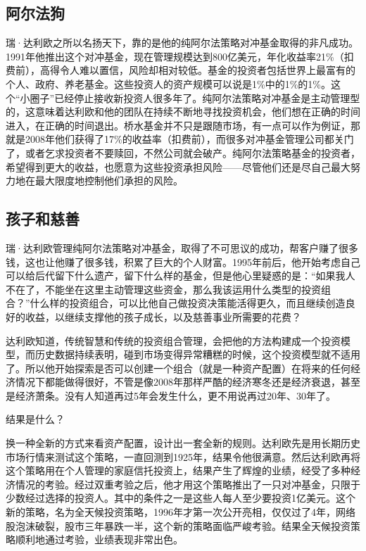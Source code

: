 \subsection{阿尔法狗}

瑞·达利欧之所以名扬天下，靠的是他的纯阿尔法策略对冲基金取得的非凡成功。1991年他推出这个对冲基金，现在管理规模达到800亿美元，年化收益率21\%（扣费前），高得令人难以置信，风险却相对较低。基金的投资者包括世界上最富有的个人、政府、养老基金。这些投资人的资产规模可以说是1\%中的1\%的1\%。这个“小圈子”已经停止接收新投资人很多年了。纯阿尔法策略对冲基金是主动管理型的，这意味着达利欧和他的团队在持续不断地寻找投资机会，他们想在正确的时间进入，在正确的时间退出。桥水基金并不只是跟随市场，有一点可以作为例证，那就是2008年他们获得了17\%的收益率（扣费前），而很多对冲基金管理公司都关门了，或者乞求投资者不要赎回，不然公司就会破产。纯阿尔法策略基金的投资者，希望得到更大的收益，也愿意为这些投资承担风险——尽管他们还是尽自己最大努力地在最大限度地控制他们承担的风险。

\subsection{孩子和慈善}

瑞·达利欧管理纯阿尔法策略对冲基金，取得了不可思议的成功，帮客户赚了很多钱，这也让他赚了很多钱，积累了巨大的个人财富。1995年前后，他开始考虑自己可以给后代留下什么遗产，留下什么样的基金，但是他心里疑惑的是：“如果我人不在了，不能坐在这里主动管理这些资金，那么我该运用什么类型的投资组合？”什么样的投资组合，可以比他自己做投资决策能活得更久，而且继续创造良好的收益，以继续支撑他的孩子成长，以及慈善事业所需要的花费？

达利欧知道，传统智慧和传统的投资组合管理，会把他的方法构建成一个投资模型，而历史数据持续表明，碰到市场变得异常糟糕的时候，这个投资模型就不适用了。所以他开始探索是否可以创建一个组合（就是一种资产配置）在将来的任何经济情况下都能做得很好，不管是像2008年那样严酷的经济寒冬还是经济衰退，甚至是经济萧条。没有人知道再过5年会发生什么，更不用说再过20年、30年了。

结果是什么？

换一种全新的方式来看资产配置，设计出一套全新的规则。达利欧先是用长期历史市场行情来测试这个策略，一直回测到1925年，结果令他很满意。然后达利欧再将这个策略用在个人管理的家庭信托投资上，结果产生了辉煌的业绩，经受了多种经济情况的考验。经过双重考验之后，他才用这个策略推出了一只对冲基金，只限于少数经过选择的投资人。其中的条件之一是这些人每人至少要投资1亿美元。这个新的策略，名为全天候投资策略，1996年才第一次公开亮相，仅仅过了4年，网络股泡沫破裂，股市三年暴跌一半，这个新的策略面临严峻考验。结果全天候投资策略顺利地通过考验，业绩表现非常出色。

